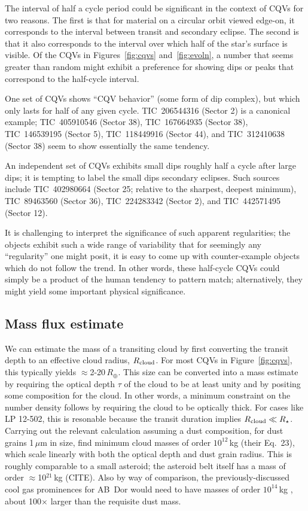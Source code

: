 \documentclass[11pt,twocolumn,tighten]{aastex63}
\begin{document}
The interval of half a cycle period could be significant in the
context of CQVs for two reasons.  The first is that for material on a
circular orbit viewed edge-on, it corresponds to the interval between
transit and secondary eclipse.  The second is that it also corresponds
to the interval over which half of the star's surface is visible.  Of
the CQVs in Figures~\ref{fig:cqvs} and~\ref{fig:evoln}, a number that
seems greater than random might exhibit a preference for showing dips
or peaks that correspond to the half-cycle interval.

One set of CQVs shows ``CQV behavior'' (some form of dip complex), but
which only lasts for half of any given cycle.  TIC~206544316 (Sector
2) is a canonical example; TIC~405910546 (Sector 38), TIC~167664935
(Sector 38), TIC~146539195 (Sector 5), TIC~118449916 (Sector 44), and
TIC~312410638 (Sector 38) seem to show essentially the same tendency.

An independent set of CQVs exhibits small dips roughly half a cycle
after large dips; it is tempting to label the small dips secondary
eclipses.  Such sources include TIC~402980664 (Sector 25; relative to
the sharpest, deepest minimum), TIC~89463560 (Sector 36),
TIC~224283342 (Sector 2), and TIC~442571495 (Sector 12).

It is challenging to interpret the significance of such apparent
regularities;  the objects exhibit such a wide range of variability
that for seemingly any ``regularity'' one might posit, it is easy to
come up with counter-example objects which do not follow the trend.
In other words, these half-cycle CQVs could simply be a product of the
human tendency to pattern match; alternatively, they might yield some
important physical significance.



\subsection{Mass flux estimate}

We can estimate the mass of a transiting cloud by first converting the
transit depth to an effective cloud radius, $R_{\rm cloud}$.  For most
CQVs in Figure~\ref{fig:cqvs}, this typically yields $\approx$2-20\,$R_\oplus$.
This size can be converted into a mass estimate by requiring the
optical depth $\tau$ of the cloud to be at least unity and by positing
some composition for the cloud.  In other
words, a minimum constraint on the number density follows by
requiring the cloud to be optically thick.  For cases like LP 12-502,
this is resonable because the transit duration implies $R_{\rm
cloud}\ll R_\star$.  Carrying out the relevant calculation assuming
a dust composition, for dust grains 1\,$\mu$m in size,
\citet{2023MNRAS.518.4734S} find minimum cloud masses of order
$10^{12}$\,kg (their Eq.~23), which scale linearly with both the
optical depth and dust grain radius.  This is roughly comparable to a
small asteroid; the asteroid belt itself has a mass of
order $\approx$10$^{21}$\,kg (CITE).  Also by way of comparison,
the previously-discussed cool gas prominences for AB~Dor would need to
have masses of order $10^{14}$\,kg \citep{1990MNRAS.247..415C}, about
100$\times$ larger than the requisite dust mass.
\end{document}
